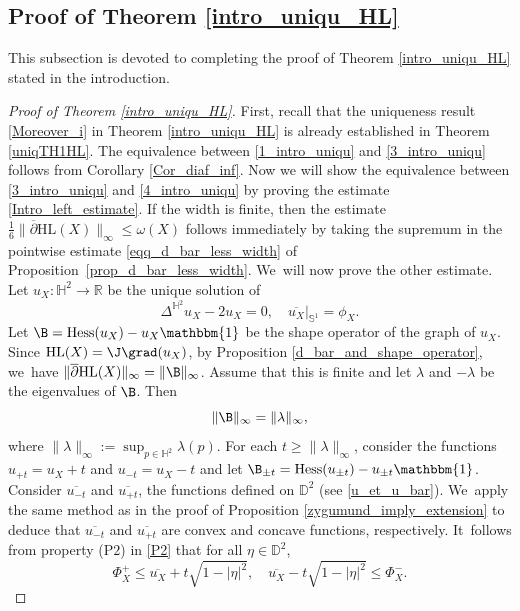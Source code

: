 \subsection{Proof of Theorem \ref{intro_uniqu_HL}}
This subsection is devoted to completing the proof of Theorem \ref{intro_uniqu_HL} stated in the introduction.
\begin{proof}[Proof of Theorem \ref{intro_uniqu_HL}]
First, recall that the uniqueness result \eqref{Moreover_i} in Theorem \ref{intro_uniqu_HL} is already established in Theorem \ref{uniqTH1HL}.
The equivalence between \eqref{1_intro_uniqu} and \eqref{3_intro_uniqu} follows from Corollary \ref{Cor_diaf_inf}. Now we will show the equivalence between \eqref{3_intro_uniqu} and \eqref{4_intro_uniqu} by proving the estimate \eqref{Intro_left_estimate}.
If the width is finite, then the estimate \(\frac{1}{6} \lVert \overline{\partial} \mathrm{HL}(X) \rVert_{\infty} \leq \omega(X)\) follows immediately by taking the supremum in the pointwise estimate \eqref{eqq_d_bar_less_width} of Proposition~\ref{prop_d_bar_less_width}. We~will now prove the other estimate. Let \(u_X:\mathbb{H}^2 \to \mathbb{R}\) be the unique solution of
\begin{equation}\label{platau_HPXX}
\Delta^{\mathbb{H}^2} u_X - 2u_X = 0, \quad
\overline{u_X}|_{\mathbb{S}^1} = \phi_X.
\end{equation}
Let \(\B = \mathrm{Hess}(u_X) - u_X \mathbbm{1}\) be the shape operator of the graph of \(u_X\). Since \(\mathrm{HL}(X) = \J\grad(u_X)\), by Proposition \ref{d_bar_and_shape_operator}, we~have \(\lVert \overline{\partial} \mathrm{HL}(X) \rVert_{\infty} = \lVert \B \rVert_{\infty}\). Assume that this is finite and let \(\lambda\) and \(-\lambda\) be the eigenvalues of $\B$. Then
\[
\lVert \B \rVert_{\infty} = \lVert \lambda \rVert_{\infty},
\]
where \(\lVert \lambda \rVert_{\infty} := \sup_{p \in \mathbb{H}^2} \lambda(p).\)
For each \(t \geq \lVert \lambda \rVert_{\infty} \), consider the functions \(u_{+t} = u_X + t \) and \(u_{-t} = u_X - t \) and let \(\B_{\pm t} = \mathrm{Hess}(u_{\pm t}) - u_{\pm t} \mathbbm{1} \). Consider \(\overline{u_{-t}} \) and \(\overline{u_{+t}} \), the functions defined on \(\mathbb{D}^2\) (see \eqref{u_et_u_bar}). We~apply the same method as in the proof of Proposition \ref{zygumund_imply_extension} to deduce that \(\overline{u_{-t}}\) and \(\overline{u_{+t}}\) are convex and concave functions, respectively. It~follows from property ($\mathrm{P2}$) in \ref{P2} that for all \(\eta \in \mathbb{D}^2 \),
\[
\Phi_X^+ \leq \overline{u_X} + t \sqrt{1 - \lvert \eta \rvert^2}, \quad \overline{u_X} - t \sqrt{1 - \lvert \eta \rvert^2} \leq \Phi_X^-.
\]
\end{proof}
